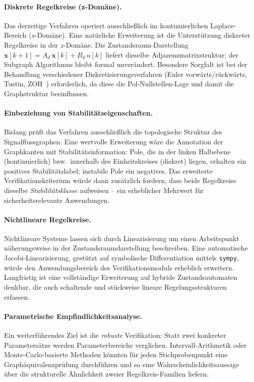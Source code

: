 \documentclass[a4paper,12pt]{article}
\theoremstyle{definition}
\begin{document}
\paragraph{Diskrete Regelkreise (z-Domäne).}
Das derzeitige Verfahren operiert ausschließlich im kontinuierlichen
Laplace-Bereich ($s$-Domäne). Eine natürliche Erweiterung ist die Unterstützung
diskreter Regelkreise in der $z$-Domäne. Die Zustandsraum-Darstellung
$\mathbf{x}[k+1] = A_d\,\mathbf{x}[k] + B_d\,u[k]$ liefert dieselbe
Adjazenzmatrixstruktur; der Subgraph Algorithmus bleibt formal unverändert.
Besondere Sorgfalt ist bei der Behandlung verschiedener
Diskretisierungsverfahren (Euler vorwärts/rückwärts, Tustin,
ZOH~\cite{franklin}) erforderlich,
da diese die Pol-Nullstellen-Lage und damit die Graphstruktur beeinflussen.

\paragraph{Einbeziehung von Stabilitätseigenschaften.}
Bislang prüft das Verfahren ausschließlich die topologische Struktur des
Signalflussgraphen. Eine wertvolle Erweiterung wäre die Annotation der
Graphkanten mit Stabilitätsinformation: Pole, die in der linken Halbebene
(kontinuierlich) bzw.\ innerhalb des Einheitskreises (diskret) liegen,
erhalten ein positives Stabilitätslabel; instabile Pole ein negatives. Das
erweiterte Verifikationskriterium würde dann zusätzlich fordern, dass beide
Regelkreise dieselbe \emph{Stabilitätsklasse} aufweisen -- ein erheblicher
Mehrwert für sicherheitsrelevante Anwendungen.

\paragraph{Nichtlineare Regelkreise.}
Nichtlineare Systeme lassen sich durch Linearisierung um einen Arbeitspunkt
näherungsweise in der Zustandsraumdarstellung beschreiben. Eine automatische
Jacobi-Linearisierung, gestützt auf symbolische Differentiation mittels
\texttt{sympy}, würde den Anwendungsbereich des Verifikationsmoduls erheblich
erweitern. Langfristig ist eine vollständige Erweiterung auf hybride
Zustandsautomaten denkbar, die auch schaltende und stückweise lineare
Regelungsstrukturen erfassen.

\paragraph{Parametrische Empfindlichkeitsanalyse.}
Ein weiterführendes Ziel ist die \emph{robuste} Verifikation: Statt zwei
konkreter Parametersätze werden Parameterbereiche verglichen.
Intervall-Arithmetik oder Monte-Carlo-basierte Methoden könnten für jeden
Stichprobenpunkt eine Graphäquivalenzprüfung durchführen und so eine
Wahrscheinlichkeitsaussage über die strukturelle Ähnlichkeit zweier
Regelkreis-Familien liefern.
\end{document}
